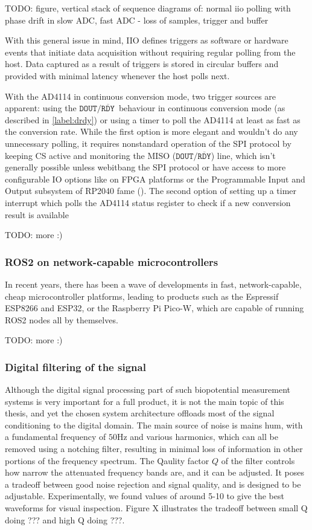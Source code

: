 \documentclass{thesis}
\newcommand{\todo}[1]{{\color{red}TODO: #1}}
\newcommand{\we}{we}
\newcommand{\Hz}{\unit{\hertz}}
\newcommand{\drdy}{{\ensuremath{\mathtt{DOUT/}\overline{\mathtt{RDY}}}}}
\begin{document}
{\todo{figure, vertical stack of sequence diagrams of: normal iio polling with phase drift in slow ADC, fast ADC - loss of samples, trigger and buffer}

With this general issue in mind, IIO defines triggers as software or hardware events that initiate data acquisition without requiring regular polling from the host. Data captured as a result of triggers is stored in circular buffers and provided with minimal latency whenever the host polls next.

With the AD4114 in continuous conversion mode, two trigger sources are apparent: using the \drdy\ behaviour in continuous conversion mode (as described in \ref{label:drdy}) or using a timer to poll the AD4114 at least as fast as the conversion rate. While the first option is more elegant and wouldn't do any unnecessary polling, it requires nonstandard operation of the SPI protocol by keeping CS active and monitoring the MISO (\drdy) line, which isn't generally possible unless \we bitbang the SPI protocol or have access to more configurable IO options like on FPGA platforms or the Programmable Input and Output subsystem of RP2040 fame (\cite{Smith2021}). The second option of setting up a timer interrupt which polls the AD4114 status register to check if a new conversion result is available

\todo{more :)}

\subsubsection{ROS2 on network-capable microcontrollers}

In recent years, there has been a wave of developments in fast, network-capable, cheap microcontroller platforms, leading to products such as the Espressif ESP8266 and ESP32, or the Raspberry Pi Pico-W, which are capable of running ROS2 nodes all by themselves. 

\todo{more :)}

\subsubsection{Digital filtering of the signal}

Although the digital signal processing part of such biopotential measurement systems is very important for a full product, it is not the main topic of this thesis, and yet the chosen system architecture offloads most of the signal conditioning to the digital domain. The main source of noise is mains hum, with a fundamental frequency of $50\Hz$ and various harmonics, which can all be removed using a notching filter, resulting in minimal loss of information in other portions of the frequency spectrum. The Qaulity factor $Q$ of the filter controls how narrow the attenuated frequency bands are, and it can be adjusted. It poses a tradeoff between good noise rejection and signal quality, and is designed to be adjustable. Experimentally, we found values of around 5-10 to give the best waveforms for visual inspection. Figure X illustrates the tradeoff between small Q doing ??? and high Q doing ???.

}
\end{document}
